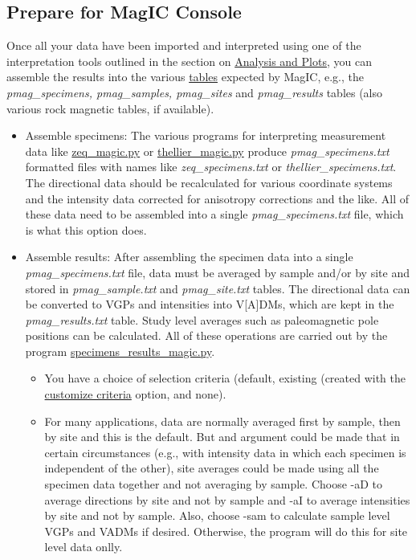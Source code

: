 \documentclass[11pt]{book}
\begin{document}
{\begin{itemize}
\end{itemize}

\subsection{Prepare for MagIC Console}
Once all your data have been imported and interpreted using one of the interpretation tools outlined in the section on \href{#AnalysisPlotsMenu}{Analysis and Plots}, you can assemble the results into the various \href{#DataTables}{tables} expected by MagIC, e.g., the {\it pmag\_specimens, pmag\_samples, pmag\_sites} and {\it pmag\_results} tables (also various rock magnetic tables, if available).  
\begin{itemize}
		\item Assemble specimens: The various programs for interpreting measurement data like \href{#zeq_magic.py}{zeq\_magic.py} or \href{#thellier_magic.py}{thellier\_magic.py} produce {\it pmag\_specimens.txt} formatted files with names like {\it zeq\_specimens.txt} or {\it thellier\_specimens.txt}.  The directional data should be recalculated for various coordinate systems and the intensity data corrected for anisotropy corrections and the like.  All of these data need to be assembled into a single {\it pmag\_specimens.txt} file, which is what this option does.  
		\item Assemble results:   After assembling the specimen data into a single {\it pmag\_specimens.txt} file, data must be averaged by sample and/or by site and stored in {\it pmag\_sample.txt} and {\it pmag\_site.txt} tables.  The directional data can be converted to VGPs and intensities into V[A]DMs, which are kept in the {\it pmag\_results.txt} table. Study level averages such as paleomagnetic pole positions can be calculated.  All of these operations are carried out by the program \href{#specimens_results_magic.py}{specimens\_results\_magic.py}.  
		\begin{itemize}  
			\item You have a choice of selection criteria (default, existing (created with the \href{#customize_criteria}{customize criteria} option, and none). 					
			\item For many applications, data are normally averaged first by sample, then by site and this is the default.  But and argument could be made that in certain circumstances (e.g.,  with intensity data in which each specimen is independent of the other), site averages could be made using all the specimen data together and not averaging by sample.  Choose  -aD to average directions by site and not by sample and -aI to average intensities by site and not by sample. Also, choose -sam to calculate sample level VGPs and VADMs if desired. Otherwise, the program will do this for site level data onlly. 

\end{itemize}
\end{itemize}}
\end{document}
